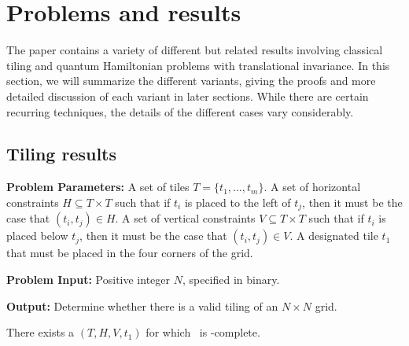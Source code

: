 \section{Problems and results}
\label{sec:results}

The paper contains a variety of different but related results involving classical tiling and
quantum Hamiltonian problems with translational invariance.  In this section, we will
summarize the different variants, giving the proofs and more detailed discussion of
each variant in later sections.  While there are certain recurring techniques, the
details of the different cases vary considerably.

\subsection{Tiling results}

\begin{definition}{\bf \tiling}

\noindent
{\bf Problem Parameters:} A set of tiles $T = \{t_1,\ldots,t_m\}$.
A set of horizontal constraints $H \subseteq T \times T$ such that if
$t_i$ is placed to the left of $t_j$, then it must be the case that
$(t_i,t_j) \in H$. A set of vertical constraints $V \subseteq T \times T$ such that if
$t_i$ is placed below $t_j$, then it must be the case that
$(t_i,t_j) \in V$. A designated tile $t_1$ that must be placed in the four corners of the grid.


\noindent
{\bf Problem Input:} Positive integer $N$, specified in binary.



\noindent
{\bf Output:} Determine whether there is a valid tiling of an $N \times N$ grid.
\end{definition}





\begin{theorem}
\label{th:unweighted-tiling}
There exists a $(T,H,V,t_1)$ for which \tiling\ is \NEXP-complete.
\end{theorem}


